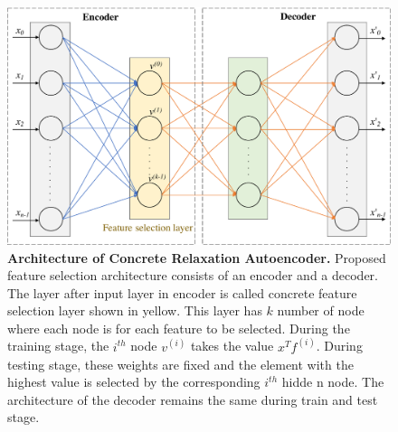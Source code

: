 \documentclass{bioinfo}
\begin{document}
\begin{figure}[hbt]
    \centering
    \includegraphics[scale=0.5]{fig/architecture.pdf}
    \caption{\textbf{Architecture of Concrete Relaxation Autoencoder.} Proposed feature selection architecture consists of an encoder and a decoder. The layer after input layer in encoder is called concrete feature selection layer shown in yellow. This layer has $k$ number of node where each node is for each feature to be selected. During the training stage, the $i^{th}$ node $v^{(i)}$ takes the value $x^Tf^{(i)}$.
During testing stage, these weights are fixed and the element with the highest value is selected by the corresponding $i^{th}$ hidde
n node.
The architecture of the decoder remains the same during train and test stage.}
    \label{fig:architecture}
\end{figure}
\end{document}
